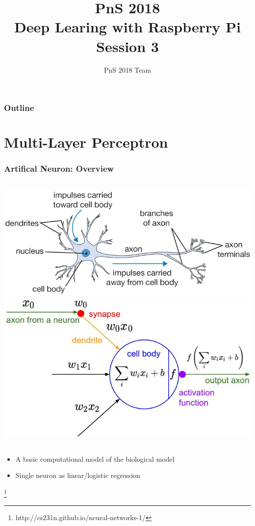 \documentclass{beamer}
\title[PnS2018]{\textbf{PnS 2018} \\
\textbf{\normalsize Deep Learing with Raspberry Pi}\\
\normalsize Session 3}
\author{PnS 2018 Team}
\institute[INI-UZH/ETHz]{Institute of Neuroinformatics \\
University of Z\"urich and ETH Z\"urich}
\date{}
\newcommand\blfootnote[1]{%
  \begingroup
  \renewcommand\thefootnote{}\footnote{#1}%
  \addtocounter{footnote}{-1}%
  \endgroup
}
\begin{document}
\titlepage

\begin{frame}
\frametitle{Outline}
\tableofcontents
\end{frame}

\section{Multi-Layer Perceptron}

\begin{frame}
  \frametitle{Artifical Neuron: Overview}
  \begin{columns}
  \includegraphics[width=\textwidth]{neuron.png}
  \includegraphics[width=\textwidth]{neuron_model.jpeg}
  \end{columns}
  \begin{itemize}
  \item A basic computational model of the biological model
  \item Single neuron as linear/logistic regression
  \end{itemize}
  \blfootnote{http://cs231n.github.io/neural-networks-1/}
\end{frame}
\end{document}
